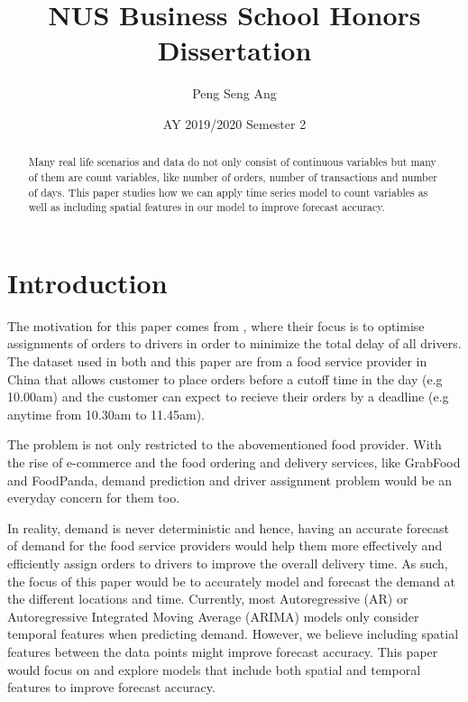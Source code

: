 \documentclass[12pt, letterpaper] {article}
\begin{document}
	\title{NUS Business School Honors Dissertation}
	\author{Peng Seng Ang}
	\date{AY 2019/2020 Semester 2}
	\maketitle
\begin{abstract}
\noindent Many real life scenarios and data do not only consist of continuous variables but many of them are count variables, like number of orders, number of transactions and number of days. This paper studies how we can apply time series model to count variables as well as including spatial features in our model to improve forecast accuracy. 

\end{abstract}
\section{Introduction}

The motivation for this paper comes from \cite{Long2018}, where their focus is to optimise assignments of orders to drivers in order to minimize the total delay of all drivers. The dataset used in both \cite{Long2018} and this paper are from a food service provider in China that allows customer to place orders before a cutoff time in the day (e.g 10.00am) and the customer can expect to recieve their orders by a deadline (e.g anytime from 10.30am to 11.45am). 

\noindent The problem is not only restricted to the abovementioned food provider. With the rise of e-commerce and the food ordering and delivery services, like GrabFood and FoodPanda, demand prediction and driver assignment problem would be an everyday concern for them too. 

\noindent In reality, demand is never deterministic and hence, having an accurate forecast of demand for the food service providers would help them more effectively and efficiently assign orders to drivers to improve the overall delivery time. As such, the focus of this paper would be to accurately model and forecast the demand at the different locations and time. Currently, most Autoregressive (AR) or Autoregressive Integrated Moving Average (ARIMA) models only consider temporal features when predicting demand. However, we believe including spatial features between the data points might improve forecast accuracy. This paper would focus on and explore models that include both spatial and temporal features to improve forecast accuracy. 
\end{document}
